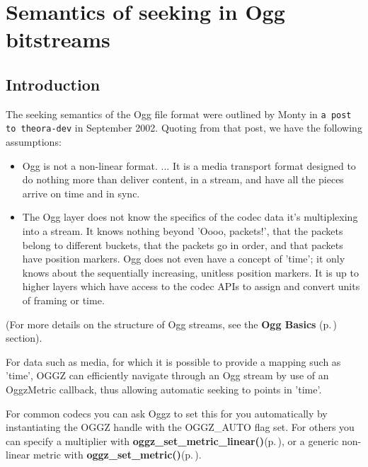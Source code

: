 \section{Semantics of seeking in Ogg bitstreams}
\label{group__seek__semantics}
\subsection{Introduction}\label{seek_semantics_intro}
The seeking semantics of the Ogg file format were outlined by Monty in {\tt a post to theora-dev} in September 2002. Quoting from that post, we have the following assumptions:

\begin{itemize}
\item Ogg is not a non-linear format. ... It is a media transport format designed to do nothing more than deliver content, in a stream, and have all the pieces arrive on time and in sync.\item The Ogg layer does not know the specifics of the codec data it's multiplexing into a stream. It knows nothing beyond 'Oooo, packets!', that the packets belong to different buckets, that the packets go in order, and that packets have position markers. Ogg does not even have a concept of 'time'; it only knows about the sequentially increasing, unitless position markers. It is up to higher layers which have access to the codec APIs to assign and convert units of framing or time.\end{itemize}


(For more details on the structure of Ogg streams, see the {\bf Ogg Basics }{\rm (p.\,\pageref{group__basics})} section).

For data such as media, for which it is possible to provide a mapping such as 'time', OGGZ can efficiently navigate through an Ogg stream by use of an Oggz\-Metric callback, thus allowing automatic seeking to points in 'time'.

For common codecs you can ask Oggz to set this for you automatically by instantiating the OGGZ handle with the OGGZ\_\-AUTO flag set. For others you can specify a multiplier with {\bf oggz\_\-set\_\-metric\_\-linear()}{\rm (p.\,\pageref{group__seek__api_ga1})}, or a generic non-linear metric with {\bf oggz\_\-set\_\-metric()}{\rm (p.\,\pageref{group__seek__api_ga2})}. 

